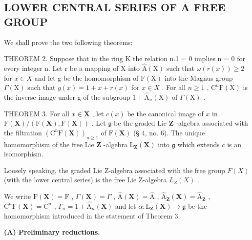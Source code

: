 \subsection{LOWER CENTRAL SERIES OF A FREE GROUP}

We shall prove the two following theorems:

THEOREM 2. Suppose that in the ring K the relation n.1 = 0 implies n = 0 for every integer n. Let r be a mapping of X into \(\hat{\mathrm{A}}(\mathrm{X})\) such that \(\omega(r(x)) \geqslant 2\) for \(x \in X\) and let g be the homomorphism of \(\mathrm{F}(\mathrm{X})\) into the Magnus group \(\Gamma(\mathrm{X})\) such that \(g(x) = 1 + x + r(x)\) for \(x \in X\) . For all \(n \geqslant 1\) , \(\mathrm{C}^n\mathrm{F}(\mathrm{X})\) is the inverse image under g of the subgroup \(1 + \hat{\mathrm{A}}_n(\mathrm{X})\) of \(\Gamma(\mathrm{X})\) .

THEOREM 3. For all \(x \in \mathbf{X}\) , let \(c(x)\) be the canonical image of \(x\) in \(\mathrm{F}(\mathbf{X}) / (\mathrm{F}(\mathbf{X}), \mathrm{F}(\mathbf{X}))\) . Let \(\mathfrak{g}\) be the graded Lie \(\mathbf{Z}\) -algebra associated with the filtration \((\mathrm{C}^{\mathrm{n}}\mathrm{F}(\mathbf{X}))_{n \geqslant 1}\) of \(\mathrm{F}(\mathbf{X})\) (§ 4, no. 6). The unique homomorphism of the free Lie \(\mathbf{Z}\) -algebra \(\mathrm{L}_{\mathbf{Z}}(\mathbf{X})\) into \(\mathfrak{g}\) which extends \(c\) is an isomorphism.

Loosely speaking, the graded Lie Z-algebra associated with the free group \(F(X)\) (with the lower central series) is the free Lie Z-algebra \(L_{Z}(X)\) .

We write \(\mathrm{F}(\mathbf{X}) = \mathrm{F}\) , \(\Gamma(\mathbf{X}) = \Gamma\) , \(\hat{\mathrm{A}}(\mathbf{X}) = \hat{\mathrm{A}}\) , \(\hat{\mathrm{A}}_{\mathbf{Z}}(\mathbf{X}) = \hat{\mathrm{A}}_{\mathbf{Z}}\) , \(\mathrm{C}^n\mathrm{F}(\mathbf{X}) = \mathrm{C}^n\) , \(\Gamma_n = 1 + \hat{\mathrm{A}}_n(\mathbf{X})\) and let \(\alpha: \mathrm{L}_{\mathbf{Z}}(\mathbf{X}) \to \mathfrak{g}\) be the homomorphism introduced in the statement of Theorem 3.

\textbf{(A) Preliminary reductions.}

